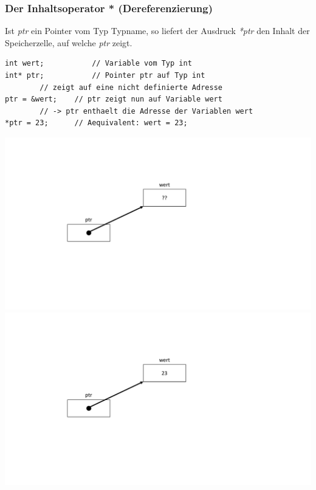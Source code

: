 \subsubsection{Der Inhaltsoperator * \textbf{(Dereferenzierung)}}
Ist \emph{ptr} ein Pointer vom Typ Typname, so liefert der Ausdruck \emph{*ptr} den Inhalt der Speicherzelle, auf welche \emph{ptr} zeigt.\\
\noindent
\begin{minipage}{0.65\linewidth}
\begin{lstlisting}
int wert;			// Variable vom Typ int
int* ptr;			// Pointer ptr auf Typ int
		// zeigt auf eine nicht definierte Adresse
ptr = &wert;	// ptr zeigt nun auf Variable wert
		// -> ptr enthaelt die Adresse der Variablen wert
*ptr = 23;		// Aequivalent: wert = 23;
\end{lstlisting}
\end{minipage}
\hspace{0.01\linewidth}
\begin{minipage}{0.2\linewidth}
	\includegraphics[width=\linewidth]{images/pointer7.pdf}
	\includegraphics[width=\linewidth]{images/pointer8.pdf}
\end{minipage}


